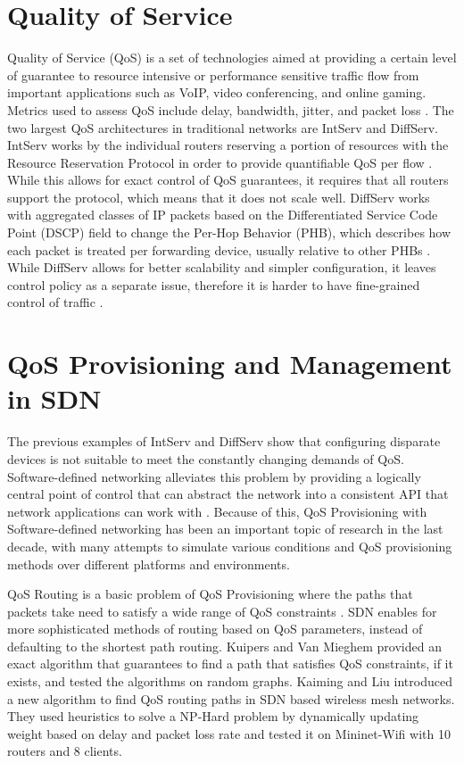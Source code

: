 \section{Quality of Service}
Quality of Service (QoS) is a set of technologies aimed at providing a certain level of guarantee to resource intensive or performance sensitive traffic flow from important applications such as VoIP, video conferencing, and online gaming. Metrics used to assess QoS include delay, bandwidth, jitter, and packet loss \cite{karakus_quality_2017}. The two largest QoS architectures in traditional networks are IntServ and DiffServ. IntServ works by the individual routers reserving a portion of resources with the Resource Reservation Protocol in order to provide quantifiable QoS per flow \cite{braden_rfc1633_1994}. While this allows for exact control of QoS guarantees, it requires that all routers support the protocol, which means that it does not scale well. DiffServ works with aggregated classes of IP packets based on the Differentiated Service Code Point (DSCP) field to change the Per-Hop Behavior (PHB), which describes how each packet is treated per forwarding device, usually relative to other PHBs \cite{blake_rfc2475_1998}. While DiffServ allows for better scalability and simpler configuration, it leaves control policy as a separate issue, therefore it is harder to have fine-grained control of traffic \cite{zhao_internet_2000}.


\section{QoS Provisioning and Management in SDN}
The previous examples of IntServ and DiffServ show that configuring disparate devices is not suitable to meet the constantly changing demands of QoS. Software-defined networking alleviates this problem by providing a logically central point of control that can abstract the network into a consistent API that network applications can work with \cite{kreutz_software-defined_2015}. Because of this, QoS Provisioning with Software-defined networking has been an important topic of research in the last decade, with many attempts to simulate various conditions and QoS provisioning methods over different platforms and environments.

QoS Routing is a basic problem of QoS Provisioning where the paths that packets take need to satisfy a wide range of QoS constraints \cite{zheng_wang_quality--service_1996}. SDN enables for more sophisticated methods of routing based on QoS parameters, instead of defaulting to the shortest path routing. Kuipers and Van Mieghem \cite{goos_qos_2001} provided an exact algorithm that guarantees to find a path that satisfies QoS constraints, if it exists, and tested the algorithms on random graphs. Kaiming and Liu \cite{kaiming_liu_novel_2016} introduced a new algorithm to find QoS routing paths in SDN based wireless mesh networks. They used heuristics to solve a NP-Hard problem by dynamically updating weight based on delay and packet loss rate and tested it on Mininet-Wifi with 10 routers and 8 clients.

